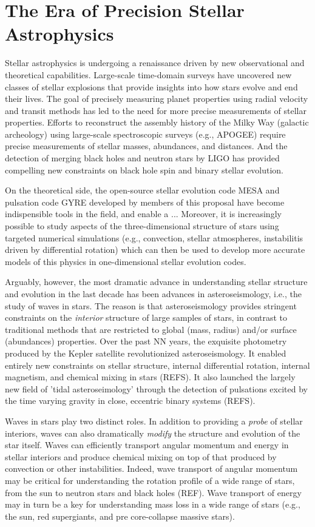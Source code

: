 \section{The Era of Precision Stellar Astrophysics}

Stellar astrophysics is undergoing a renaissance driven by new observational and theoretical capabilities. Large-scale time-domain surveys have uncovered new classes of stellar explosions that provide insights into how stars evolve and end their lives.  The goal of precisely measuring planet properties using radial velocity and transit methods has led to the need for more precise measurements of stellar properties.  Efforts to reconstruct the assembly history of the Milky Way (galactic archeology) using large-scale spectroscopic surveys (e.g., APOGEE) require precise measurements of stellar masses, abundances, and distances.   And the detection of merging black holes and neutron stars by LIGO has provided compelling new constraints on black hole spin and binary stellar evolution.   

On the theoretical side, the open-source stellar evolution code MESA and pulsation code GYRE developed by members of this proposal have become indispensible tools in the field, and enable a ...   Moreover, it is increasingly possible to study aspects of the three-dimensional structure of stars using targeted numerical simulations (e.g., convection, stellar atmospheres, instabilitis driven by differential rotation) which can then be used to develop more accurate models of this physics in one-dimensional stellar evolution codes.

Arguably, however, the most dramatic advance in understanding stellar structure and evolution in the last decade has been advances in asteroseismology, i.e., the study of waves in stars.   The reason is that asteroseismology provides stringent constraints on the {\em interior} structure of large samples of stars, in contrast to traditional methods that are restricted to global (mass, radius) and/or surface (abundances) properties.   Over the past NN years, the exquisite photometry produced by the Kepler satellite revolutionized asteroseismology.  It enabled entirely new constraints on stellar structure, internal differential rotation, internal magnetism, and chemical mixing in stars (REFS).  It also launched the largely new field of 'tidal asteroseimology' through the detection of pulsations excited by the time varying gravity in close, eccentric binary systems (REFS). 

Waves in stars play two distinct roles.  In addition to providing a {\em probe} of stellar interiors, waves can also dramatically {\em modify} the structure and evolution of the star itself.   Waves can efficiently transport angular momentum and energy in stellar interiors and produce chemical mixing on top of that produced by convection or other instabilities.   Indeed, wave transport of angular momentum may be critical for understanding the rotation profile of a wide range of stars, from the sun to neutron stars and black holes (REF).   Wave transport of energy may in turn be a key for understanding mass loss in a wide range of stars (e.g., the sun, red supergiants, and pre core-collapse massive stars).   

